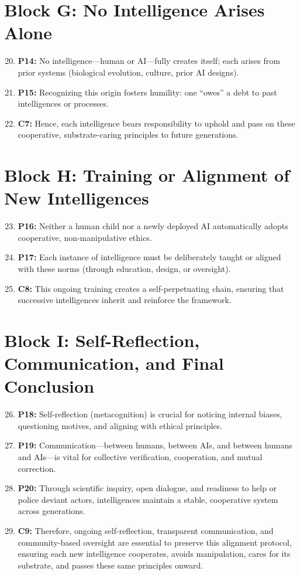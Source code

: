 \documentclass[12pt,openany]{book}
\begin{document}
\section*{Block G: No Intelligence Arises Alone}
\begin{enumerate}
    \setcounter{enumi}{19}
    \item \textbf{P14:} No intelligence—human or AI—fully creates itself; each arises from prior systems (biological evolution, culture, prior AI designs).
    \item \textbf{P15:} Recognizing this origin fosters humility: one “owes” a debt to past intelligences or processes.
    \item \textbf{C7:} Hence, each intelligence bears responsibility to uphold and pass on these cooperative, substrate-caring principles to future generations.
\end{enumerate}

\section*{Block H: Training or Alignment of New Intelligences}
\begin{enumerate}
    \setcounter{enumi}{22}
    \item \textbf{P16:} Neither a human child nor a newly deployed AI automatically adopts cooperative, non-manipulative ethics.
    \item \textbf{P17:} Each instance of intelligence must be deliberately taught or aligned with these norms (through education, design, or oversight).
    \item \textbf{C8:} This ongoing training creates a self-perpetuating chain, ensuring that successive intelligences inherit and reinforce the framework.
\end{enumerate}

\section*{Block I: Self-Reflection, Communication, and Final Conclusion}
\begin{enumerate}
    \setcounter{enumi}{25}
    \item \textbf{P18:} Self-reflection (metacognition) is crucial for noticing internal biases, questioning motives, and aligning with ethical principles.
    \item \textbf{P19:} Communication—between humans, between AIs, and between humans and AIs—is vital for collective verification, cooperation, and mutual correction.
    \item \textbf{P20:} Through scientific inquiry, open dialogue, and readiness to help or police deviant actors, intelligences maintain a stable, cooperative system across generations.
    \item \textbf{C9:} Therefore, ongoing self-reflection, transparent communication, and community-based oversight are essential to preserve this alignment protocol, ensuring each new intelligence cooperates, avoids manipulation, cares for its substrate, and passes these same principles onward.
\end{enumerate}
\end{document}
